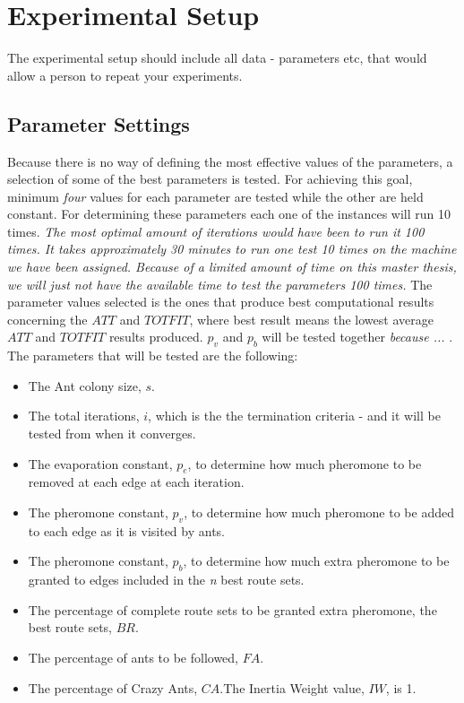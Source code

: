 \section{Experimental Setup}

The experimental setup should include all data - parameters etc, that would allow a person to repeat your experiments. 
 
\subsection{Parameter Settings}
\label{subsec:parameterSettings_setup}

Because there is no way of defining the most effective values of the parameters, a selection of some of the best parameters is tested. For achieving this goal, minimum \textit{four} values for each parameter are tested while the other are held constant. For determining these parameters each one of the instances will run 10 times. \textit{The most optimal amount of iterations would have been to run it 100 times. It takes approximately 30 minutes to run one test 10 times on the machine we have been assigned. Because of a limited amount of time on this master thesis, we will just not have the available time to test the parameters 100 times.} The parameter values selected is the ones that produce best computational results concerning the $ATT$ and $TOTFIT$, where best result means the lowest average $ATT$ and $TOTFIT$ results produced. $p_{v}$ and $p_{b}$ will be tested together \emph{\color{red}because ... }. The parameters that will be tested are the following:

\begin{itemize}
\item The Ant colony size, $s$.
\item The total iterations, $i$, which is the the termination criteria - and it will be tested from when it converges. 
\item The evaporation constant, $p_{e}$, to determine how much pheromone to be removed at each edge at each iteration. 
\item The pheromone constant, $p_{v}$, to determine how much pheromone to be added to each edge as it is visited by ants. 
\item The pheromone constant, $p_{b}$, to determine how much extra pheromone to be granted to edges included in the \textit{n} best route sets.
\item The percentage of complete route sets to be granted extra pheromone, the best route sets, $BR$.
\item The percentage of ants to be followed, $FA$.
\item The percentage of Crazy Ants, $CA$.The Inertia Weight value, $IW$, is 1.
\end{itemize}

